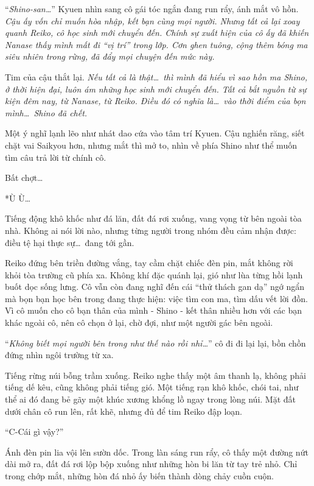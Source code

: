 \documentclass[../main.tex]{subfiles}
\begin{document}
``\textit{Shino-san\dots}'' Kyuen nhìn sang cô gái tóc ngắn đang run rẩy, ánh mắt vô hồn. \textit{Cậu ấy vốn chỉ muốn hòa nhập, kết bạn cùng mọi người. Nhưng tất cả lại xoay quanh Reiko, cô học sinh mới chuyển đến. Chính sự xuất hiện của cô ấy đã khiến Nanase thấy mình mất đi ``vị trí'' trong lớp. Cơn ghen tuông, cộng thêm bóng ma siêu nhiên trong rừng, đã đẩy mọi chuyện đến mức này.}

Tim của cậu thắt lại. \textit{Nếu tất cả là thật\dots\ thì mình đã hiểu vì sao hồn ma Shino, ở thời hiện đại, luôn ám những học sinh mới chuyển đến. Tất cả bắt nguồn từ sự kiện đêm nay, từ Nanase, từ Reiko. Điều đó có nghĩa là\dots\ vào thời điểm của bọn mình\dots\ Shino đã chết.}

Một ý nghĩ lạnh lẽo như nhát dao cứa vào tâm trí Kyuen. Cậu nghiến răng, siết chặt vai Saikyou hơn, nhưng mắt thì mở to, nhìn về phía Shino như thể muốn tìm câu trả lời từ chính cô.

Bất chợt\dots

*Ù Ù\dots*

Tiếng động khô khốc như đá lăn, đất đá rơi xuống, vang vọng từ bên ngoài tòa nhà. Không ai nói lời nào, nhưng từng người trong nhóm đều cảm nhận được: điều tệ hại thực sự\dots\ đang tới gần.

\il

Reiko đứng bên triền đường vắng, tay cầm chặt chiếc đèn pin, mắt không rời khỏi tòa trường cũ phía xa. Không khí đặc quánh lại, gió như lùa từng hồi lạnh buốt dọc sống lưng. Cô vẫn còn đang nghĩ đến cái ``thử thách gan dạ'' ngớ ngẩn mà bọn bạn học bên trong đang thực hiện: việc tìm con ma, tìm dấu vết lời đồn. Vì cô muốn cho cô bạn thân của mình - Shino - kết thân nhiều hơn với các bạn khác ngoài cô, nên cô chọn ở lại, chờ đợi, như một người gác bên ngoài.

``\textit{Không biết mọi người bên trong như thế nào rồi nhỉ\dots}'' cô đi đi lại lại, bồn chồn đứng nhìn ngôi trường từ xa.

Tiếng rừng núi bỗng trầm xuống. Reiko nghe thấy một âm thanh lạ, không phải tiếng dế kêu, cũng không phải tiếng gió. Một tiếng rạn khô khốc, chói tai, như thể ai đó đang bẻ gãy một khúc xương khổng lồ ngay trong lòng núi. Mặt đất dưới chân cô run lên, rất khẽ, nhưng đủ để tim Reiko đập loạn.

``C-Cái gì vậy?''

Ánh đèn pin lia vội lên sườn dốc. Trong làn sáng run rẩy, cô thấy một đường nứt dài mở ra, đất đá rơi lộp bộp xuống như những hòn bi lăn từ tay trẻ nhỏ. Chỉ trong chớp mắt, những hòn đá nhỏ ấy biến thành dòng chảy cuồn cuộn.
\end{document}
